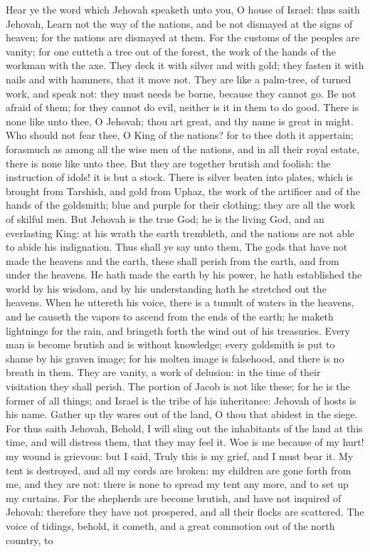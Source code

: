 Hear ye the word which Jehovah speaketh unto you, O house of Israel: thus saith Jehovah, Learn not the way of the nations, and be not dismayed at the signs of heaven; for the nations are dismayed at them. For the customs of the peoples are vanity; for one cutteth a tree out of the forest, the work of the hands of the workman with the axe. They deck it with silver and with gold; they fasten it with nails and with hammers, that it move not. They are like a palm-tree, of turned work, and speak not: they must needs be borne, because they cannot go. Be not afraid of them; for they cannot do evil, neither is it in them to do good.  There is none like unto thee, O Jehovah; thou art great, and thy name is great in might. Who should not fear thee, O King of the nations? for to thee doth it appertain; forasmuch as among all the wise men of the nations, and in all their royal estate, there is none like unto thee. But they are together brutish and foolish: the instruction of idols! it is but a stock. There is silver beaten into plates, which is brought from Tarshish, and gold from Uphaz, the work of the artificer and of the hands of the goldsmith; blue and purple for their clothing; they are all the work of skilful men. But Jehovah is the true God; he is the living God, and an everlasting King: at his wrath the earth trembleth, and the nations are not able to abide his indignation.  Thus shall ye say unto them, The gods that have not made the heavens and the earth, these shall perish from the earth, and from under the heavens.  He hath made the earth by his power, he hath established the world by his wisdom, and by his understanding hath he stretched out the heavens. When he uttereth his voice, there is a tumult of waters in the heavens, and he causeth the vapors to ascend from the ends of the earth; he maketh lightnings for the rain, and bringeth forth the wind out of his treasuries. Every man is become brutish and is without knowledge; every goldsmith is put to shame by his graven image; for his molten image is falsehood, and there is no breath in them. They are vanity, a work of delusion: in the time of their visitation they shall perish. The portion of Jacob is not like these; for he is the former of all things; and Israel is the tribe of his inheritance: Jehovah of hosts is his name.  Gather up thy wares out of the land, O thou that abidest in the siege. For thus saith Jehovah, Behold, I will sling out the inhabitants of the land at this time, and will distress them, that they may feel it.  Woe is me because of my hurt! my wound is grievous: but I said, Truly this is my grief, and I must bear it. My tent is destroyed, and all my cords are broken: my children are gone forth from me, and they are not: there is none to spread my tent any more, and to set up my curtains. For the shepherds are become brutish, and have not inquired of Jehovah: therefore they have not prospered, and all their flocks are scattered. The voice of tidings, behold, it cometh, and a great commotion out of the north country, to 